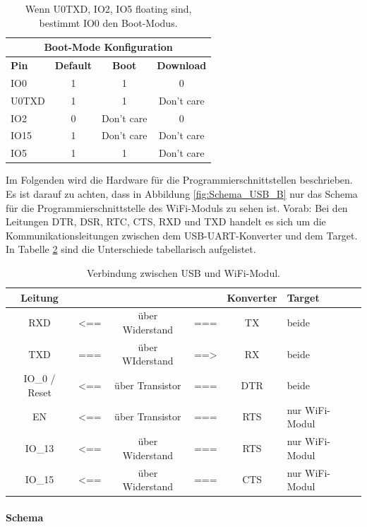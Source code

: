 \begin{table}[H]
\center
\begin{tabular}{|l|c|c|c|}
\hline
\multicolumn{4}{|c|}{\textbf{Boot-Mode Konfiguration}}\\
\hline
\textbf{Pin} & \textbf{Default} & \textbf{Boot} & \textbf{Download} \\
\hline
IO0 & 1 & 1 & 0 \\
\hline
U0TXD & 1 & 1 & Don't care \\
\hline
IO2 & 0 & Don't care & 0 \\
\hline
IO15 & 1 & Don't care & Don't care \\
\hline
IO5 & 1 & 1 & Don't care \\
\hline
\end{tabular}
\caption{Wenn U0TXD, IO2, IO5 floating sind, bestimmt IO0 den Boot-Modus.}
\label{tab:Einfluss_Pins_auf_Boot_Modus}
\end{table}

Im Folgenden wird die Hardware für die Programmierschnittstellen beschrieben. Es ist darauf zu achten, dass in Abbildung \ref{fig:Schema_USB_B} nur das Schema für die Programmierschnittstelle des WiFi-Moduls zu sehen ist. Vorab: Bei den Leitungen DTR, DSR, RTC, CTS, RXD und TXD handelt es sich um die Kommunikationsleitungen zwischen dem USB-UART-Konverter und dem Target. In Tabelle \ref{tab:USB_ESP} sind die Unterschiede tabellarisch aufgelistet.

\begin{table}[H]
\center
\begin{tabular}{|c|lcl|c||l|}
\hline
\textbf{Leitung} & & & & \textbf{Konverter} & \textbf{Target} \\ \hline
RXD & <== & über Widerstand & === & TX & beide \\
TXD & === & über WIderstand & ==> & RX & beide\\
IO\_0 / Reset & <== & über Transistor & === & DTR & beide\\
EN & <== & über Transistor & === & RTS & nur WiFi-Modul\\
IO\_13 & <== & über Widerstand & === & RTS & nur WiFi-Modul\\
IO\_15 & <== & über Widerstand & === & CTS & nur WiFi-Modul\\
\hline
\end{tabular}
\caption{Verbindung zwischen USB und WiFi-Modul.}
\label{tab:USB_ESP}
\end{table}

\paragraph{Schema}\mbox{}


